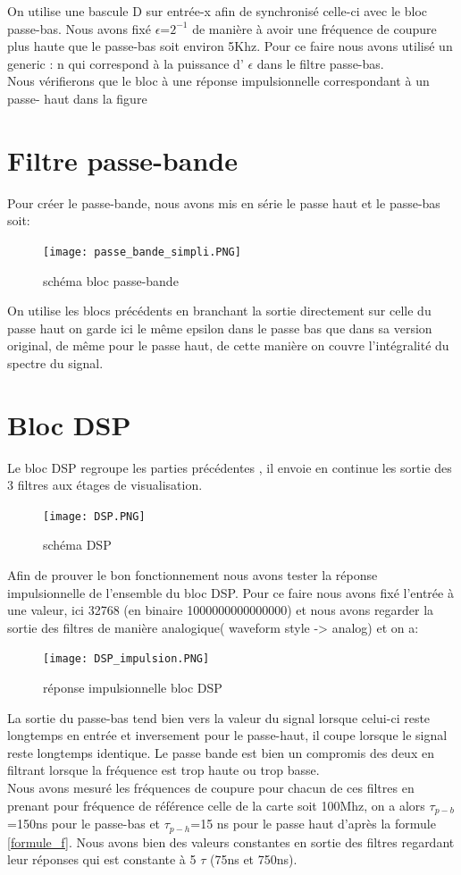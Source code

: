 \documentclass[hidelinks]{article}
\begin{document}
	On utilise une bascule D sur entrée-x afin de synchronisé celle-ci avec le bloc passe-bas. Nous avons fixé $\epsilon$=$2^{-1}$ de manière à avoir une fréquence de coupure plus haute que le passe-bas soit environ 5Khz. Pour ce faire nous avons utilisé un generic : n qui correspond à la puissance d'  $\epsilon$ dans le filtre passe-bas.  \\
	Nous vérifierons que le bloc à une réponse impulsionnelle correspondant à un passe- haut dans la figure \cite{sim_dsp}
	\newpage 

    \section{Filtre passe-bande}
	Pour créer le passe-bande, nous avons mis en série le passe haut et le passe-bas soit:
	\begin{figure}[h]
		\centering
		\texttt{[image: passe\_bande\_simpli.PNG]}
		\caption{schéma bloc passe-bande}
	\end{figure}

	On utilise les blocs précédents en branchant la sortie directement sur celle du passe haut
	on garde ici le même epsilon dans le passe bas que dans sa version original, de même pour le passe haut, de cette manière on couvre l'intégralité du spectre du signal.

    \section{Bloc DSP}
    Le bloc DSP regroupe les parties précédentes , il envoie en continue les sortie des 3 filtres aux étages de visualisation.
    
	\begin{figure}[h]
		\centering
		\texttt{[image: DSP.PNG]}
		\caption{schéma DSP}
	\end{figure}
	Afin de prouver le bon fonctionnement nous avons tester la réponse impulsionnelle de l'ensemble du bloc DSP. Pour ce faire nous avons fixé l'entrée à une valeur, ici 32768 (en binaire 1000000000000000) et nous avons regarder la sortie des filtres de manière analogique( waveform style -> analog) et on a:
	
	\begin{figure}[H]
		\centering
		\texttt{[image: DSP\_impulsion.PNG]}
		\caption{réponse impulsionnelle bloc DSP}
	\end{figure}

	La sortie du passe-bas tend bien vers la valeur du signal lorsque celui-ci reste longtemps en entrée et inversement pour le passe-haut, il coupe lorsque le signal reste longtemps identique. Le passe bande est bien un compromis des deux en filtrant lorsque la fréquence est trop haute ou trop basse.\\
	Nous avons mesuré les fréquences de coupure pour chacun de ces filtres en prenant pour fréquence de référence celle de la carte soit 100Mhz, on a alors $\tau_{p-b}$=150ns pour le passe-bas et $\tau_{p-h}$=15 ns pour le passe haut d'après la formule \ref{formule_f}. Nous avons bien des valeurs constantes en sortie des filtres regardant leur réponses qui est constante à 5 $\tau$ (75ns et 750ns).
	\newpage
\end{document}
